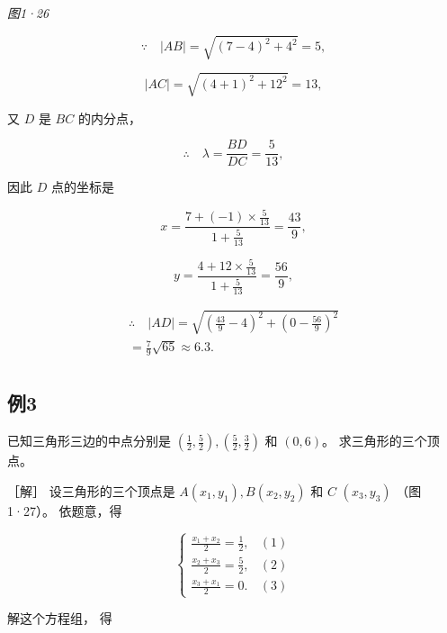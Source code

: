 \emph{图1·26}

\[
\because \quad | AB | = \sqrt {(7 - 4) ^ {2} + 4^{2}} = 5,
\]

\[
\vert AC \vert = \sqrt {(4 + 1) ^ {2} + 12^{2}} = 13,
\]

又 \(D\) 是 \(BC\) 的内分点，

\[
\therefore \quad \lambda = \frac {BD}{DC} = \frac {5}{13},
\]

因此 \(D\) 点的坐标是

\[
x = \frac {7 + (- 1) \times \frac {5}{13}}{1 + \frac {5}{13}} = \frac {43}{9},
\]

\[
y = \frac {4 + 12 \times \frac {5}{13}}{1 + \frac {5}{13}} = \frac {56}{9},
\]

\[
\begin{array}{l} \therefore \quad | AD | = \sqrt {\left(\frac {43}{9} - 4\right) ^ {2} + \left(0 - \frac {56}{9}\right) ^ {2}} \\ = \frac {7}{9} \sqrt {65} \approx 6. 3. \\ \end{array}
\]

\subsection{例3}\label{ux4f8b3-3}

已知三角形三边的中点分别是
\(\left(\frac{1}{2}, \frac{5}{2}\right), \left(\frac{5}{2}, \frac{3}{2}\right)\)
和 \((0, 6)\)。 求三角形的三个顶点。

［解］ 设三角形的三个顶点是 \(A(x_{1}, y_{1}), B(x_{2}, y_{2})\) 和
\(C\) \((x_{3}, y_{3})\) （图1·27）。 依题意，得

\[
\left\{ \begin{array}{ll} \frac {x_{1} + x_{2}}{2} = \frac {1}{2}, & (1) \\ \frac {x_{2} + x_{3}}{2} = \frac {5}{2}, & (2) \\ \frac {x_{3} + x_{1}}{2} = 0. & (3) \end{array} \right.
\]

解这个方程组， 得


